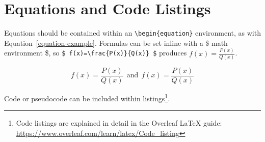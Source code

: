 \section{Equations and Code Listings}

Equations should be contained within an \texttt{\textbackslash begin\{equation\}} environment, as with Equation~\ref{equation-example}. Formulas can be set inline with a \$ math environment \$, so \texttt{\$ f(x)=\textbackslash frac\{P(x)\}\{Q(x)\} \$} produces $ f(x)=\frac{P(x)}{Q(x)} $.

\begin{equation}\label{equation-example}
f(x)=\frac{P(x)}{Q(x)} \ \
\textrm{and} \ \
f(x)=\textstyle\frac{P(x)}{Q(x)}
\end{equation}

Code or pseudocode can be included within listings\footnote{Code listings are explained in detail in the Overleaf \LaTeX{} guide: \url{https://www.overleaf.com/learn/latex/Code\_listing}}.